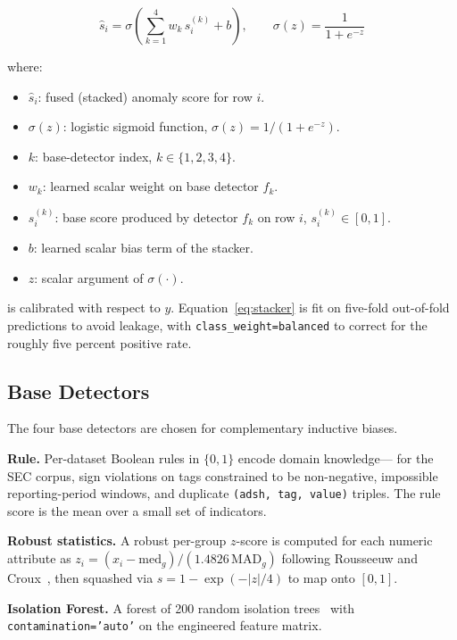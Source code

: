 \documentclass{ieeeaccess}
\begin{document}
\begin{equation}
\hat{s}_i = \sigma\!\left(\sum_{k=1}^{4} w_k\, s_i^{(k)} + b\right),
\qquad \sigma(z) = \frac{1}{1+e^{-z}}
\label{eq:stacker}
\end{equation}

\noindent where:
\begin{itemize}\setlength{\itemsep}{0pt}\setlength{\parskip}{0pt}
\item $\hat{s}_i$: fused (stacked) anomaly score for row $i$.
\item $\sigma(z)$: logistic sigmoid function, $\sigma(z)=1/(1+e^{-z})$.
\item $k$: base-detector index, $k\in\{1,2,3,4\}$.
\item $w_k$: learned scalar weight on base detector $f_k$.
\item $s_i^{(k)}$: base score produced by detector $f_k$ on row $i$, $s_i^{(k)}\in[0,1]$.
\item $b$: learned scalar bias term of the stacker.
\item $z$: scalar argument of $\sigma(\cdot)$.
\end{itemize}

is calibrated with respect to $y$. Equation~\eqref{eq:stacker} is fit on
five-fold out-of-fold predictions to avoid leakage, with
\texttt{class\_weight=balanced} to correct for the roughly five percent positive
rate.

\subsection{Base Detectors}

The four base detectors are chosen for complementary inductive biases.

\textbf{Rule.} Per-dataset Boolean rules in $\{0,1\}$ encode domain knowledge---
for the SEC corpus, sign violations on tags constrained to be non-negative,
impossible reporting-period windows, and duplicate \texttt{(adsh, tag, value)}
triples. The rule score is the mean over a small set of indicators.

\textbf{Robust statistics.} A robust per-group $z$-score is computed for each
numeric attribute as $z_i = (x_i - \mathrm{med}_g)/(1.4826\,\mathrm{MAD}_g)$
following Rousseeuw and Croux~\cite{rousseeuw1993alternatives}, then squashed via
$s = 1 - \exp(-|z|/4)$ to map onto $[0,1]$.

\textbf{Isolation Forest.} A forest of 200 random isolation
trees~\cite{liu2008isolation} with \texttt{contamination='auto'} on the
engineered feature matrix.
\end{document}
